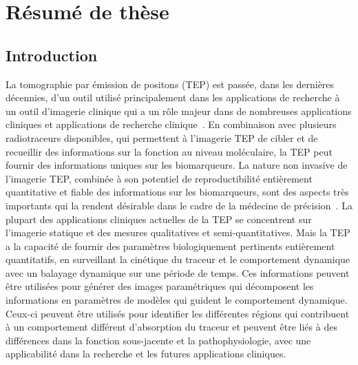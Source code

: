 \chapter{Résumé de thèse}
\section*{Introduction}
La tomographie par émission de positons (TEP) est passée, dans les dernières décennies, d'un outil utilisé principalement dans les applications de recherche à un outil d'imagerie clinique qui a un rôle majeur dans de nombreuses applications cliniques et applications de recherche clinique~\cite{Meikle2021}. 
En combinaison avec plusieurs radiotraceurs disponibles, qui permettent à l'imagerie TEP de cibler et de recueillir des informations sur la fonction au niveau moléculaire, la TEP peut fournir des informations uniques sur les biomarqueurs. La nature non invasive de l'imagerie TEP, combinée à son potentiel de reproductibilité entièrement quantitative et fiable des informations sur les biomarqueurs, sont des aspects très importants qui la rendent désirable dans le cadre de la médecine de précision~\cite{Subramaniam2017,Meikle2021}.
La plupart des applications cliniques actuelles de la TEP se concentrent sur l'imagerie statique et des mesures qualitatives et semi-quantitatives. Mais la TEP a la capacité de fournir des paramètres biologiquement pertinents entièrement quantitatifs, en surveillant la cinétique du traceur et le comportement dynamique avec un balayage dynamique sur une période de temps. Ces informations peuvent être utilisées pour générer des images paramétriques qui décomposent les informations en paramètres de modèles qui guident le comportement dynamique. Ceux-ci peuvent être utilisés pour identifier les différentes régions qui contribuent à un comportement différent d'absorption du traceur et peuvent être liés à des différences dans la fonction sous-jacente et la pathophysiologie, avec une applicabilité dans la recherche et les futures applications cliniques.

